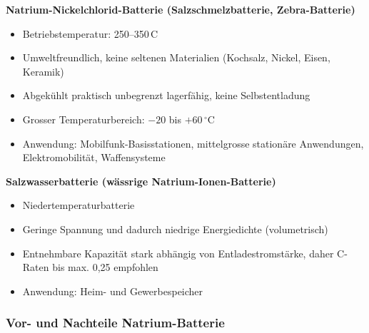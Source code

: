 \textbf{Natrium-Nickelchlorid-Batterie (Salzschmelzbatterie, Zebra-Batterie)}
  \begin{itemize}
    \item Betriebstemperatur: 250--350\,\textdegree C
    \item Umweltfreundlich, keine seltenen Materialien (Kochsalz, Nickel, Eisen, Keramik)
    \item Abgekühlt praktisch unbegrenzt lagerfähig, keine Selbstentladung
    \item Grosser Temperaturbereich: $-20$ bis $+60\,^\circ$C
    \item Anwendung: Mobilfunk-Basisstationen, mittelgrosse stationäre Anwendungen, Elektromobilität, Waffensysteme
  \end{itemize}

\textbf{Salzwasserbatterie (wässrige Natrium-Ionen-Batterie)}
  \begin{itemize}
    \item Niedertemperaturbatterie
    \item Geringe Spannung und dadurch niedrige Energiedichte (volumetrisch)
    \item Entnehmbare Kapazität stark abhängig von Entladestromstärke, daher C-Raten bis max. 0{,}25 empfohlen
    \item Anwendung: Heim- und Gewerbespeicher
  \end{itemize}



\subsubsection{Vor- und Nachteile Natrium-Batterie}

